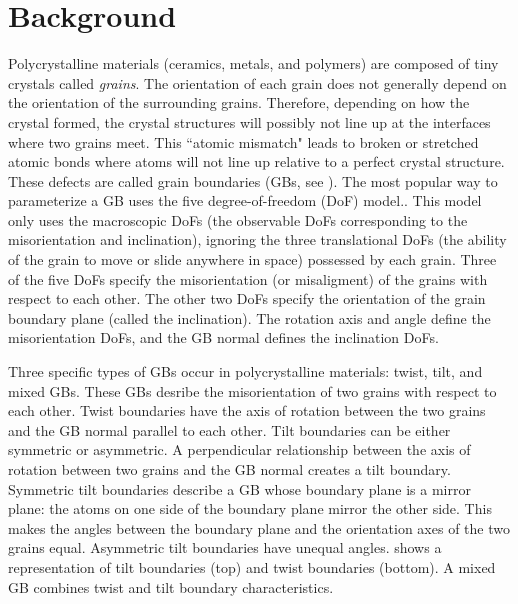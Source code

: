 \documentclass[12pt]{report}
\begin{document}
\chapter{Background\label{background}}
Polycrystalline materials (ceramics, metals, and polymers) are composed of tiny crystals called \emph{grains}.  The orientation of each grain does not generally depend on the orientation of the surrounding grains. Therefore, depending on how the crystal formed,\cite{callister2003} the crystal structures will possibly not line up at the interfaces where two grains meet.  This ``atomic mismatch"\cite{callister2003} leads to broken or stretched atomic bonds where atoms will not line up relative to a perfect crystal structure.  These defects are called grain boundaries (GBs, see ). The most popular way to parameterize a GB uses the five degree-of-freedom (DoF) model.\cite{patala2013, lejcek2010, homer2015, bulatov2014, harbison2015, rohrer2011}.  This model only uses the macroscopic DoFs (the observable DoFs corresponding to the misorientation and inclination), ignoring the three translational DoFs (the ability of the grain to move or slide anywhere in space) possessed by each grain.  Three of the five DoFs specify the misorientation (or misaligment) of the grains with respect to each other.  The other two DoFs specify the orientation of the grain boundary plane (called the inclination).  The rotation axis and angle define the misorientation DoFs, and the GB normal defines the inclination DoFs.\cite{lejcek2010}

Three specific types of GBs occur in polycrystalline materials: twist, tilt, and mixed GBs.\cite{lejcek2010, rohrer2011}  These GBs desribe the misorientation of two grains with respect to each other.  Twist boundaries have the axis of rotation between the two grains and the GB normal parallel to each other. Tilt boundaries can be either symmetric or asymmetric.  A perpendicular relationship between the axis of rotation between two grains and the GB normal creates a tilt boundary.  Symmetric tilt boundaries describe a GB whose boundary plane is a mirror plane: the atoms on one side of the boundary plane mirror the other side.  This makes the angles between the boundary plane and the orientation axes of the two grains equal. Asymmetric tilt boundaries have unequal angles.   shows a representation of tilt boundaries (top) and twist boundaries (bottom).  A mixed GB combines twist and tilt boundary characteristics.
\end{document}
